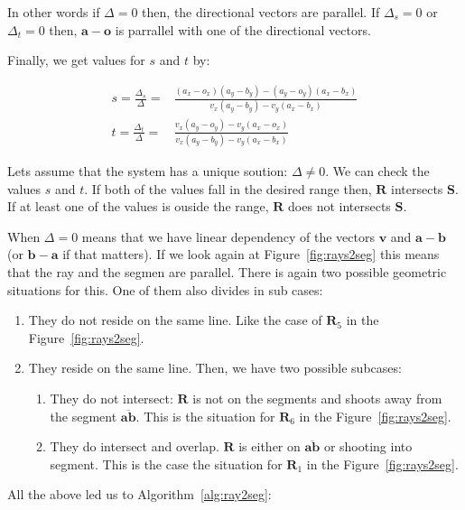 In other words if $\Delta = 0$ then, the directional vectors are parallel.
If $\Delta_s =  0$ or $\Delta_t = 0$ then, $\mathbf{a} - \mathbf{o}$ is parrallel with one of the directional vectors.

Finally, we get values for $s$ and $t$ by:

\begin{align*}
s = \frac{\Delta_s}{\Delta} =&  \frac{(a_x - o_x)(a_y - b_y) - (a_y - o_y)(a_x - b_x)}{v_x(a_y - b_y) - v_y(a_x - b_x)} \\
t = \frac{\Delta_t}{\Delta} =&  \frac{v_x(a_y - o_y) - v_y(a_x - o_x)}{v_x(a_y - b_y) - v_y(a_x - b_x)}
\end{align*}

Lets assume that the system has a unique soution: $\Delta \neq 0$. We can check the values $s$ and $t$. If both of the values fall in the desired range then, $\mathbf{R}$ intersects $\mathbf{S}$. If at least one of the values is ouside the range, $\mathbf{R}$ does not intersects $\mathbf{S}$.

When $\Delta = 0$ means that we have linear dependency of the vectors $\mathbf{v}$ and $\mathbf{a} - \mathbf{b}$ (or $\mathbf{b} - \mathbf{a}$ if that matters).
If we look again at Figure~\ref{fig:rays2seg} this means that the ray and the segmen are parallel.
There is again two possible geometric situations for this. One of them also divides in sub cases: 
\begin{enumerate}
  \item They do not reside on the same line. Like the case of $\mathbf{R}_5$ in the Figure~\ref{fig:rays2seg}.
  \item They reside on the same line. Then, we have two possible subcases:
  \begin{enumerate}
    \item They do not intersect: $\mathbf{R}$ is not on the segments and shoots away from the segment $\overline{\mathbf{a}\mathbf{b}}$. This is the situation for $\mathbf{R}_6$ in the Figure~\ref{fig:rays2seg}.
    \item They do intersect and overlap. $\mathbf{R}$ is either on $\overline{\mathbf{a}\mathbf{b}}$ or shooting into segment. This is the case the situation for $\mathbf{R}_1$ in the Figure~\ref{fig:rays2seg}.
  \end{enumerate}
\end{enumerate}

All the above led us to Algorithm~\ref{alg:ray2seg}:

